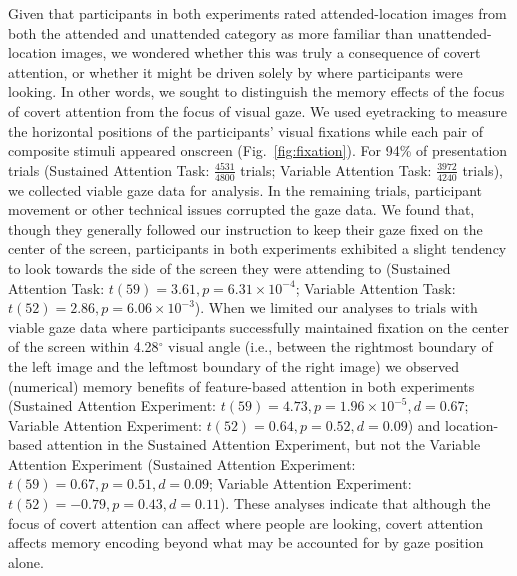 \documentclass[english]{article}
\begin{document}
Given that participants in both experiments rated attended-location images from both the attended and unattended category as more familiar than unattended-location images, we wondered whether this was truly a consequence of covert attention, or whether it might be driven solely by where participants were looking. In other words, we sought to distinguish the memory effects of the focus of covert attention from the focus of visual gaze.  We used eyetracking to measure the horizontal positions of the participants' visual fixations while each pair of composite stimuli appeared onscreen (Fig.~\ref{fig:fixation}). For 94\% of presentation trials (Sustained Attention Task: $\frac{4531}{4800}$ trials; Variable Attention Task: $\frac{3972}{4240}$ trials), we collected viable gaze data for analysis. In the remaining trials, participant movement or other technical issues corrupted the gaze data. We found that, though they generally followed our instruction to keep their gaze fixed on the center of the screen, participants in both experiments exhibited a slight tendency to look towards the side of the screen they were attending to (Sustained Attention Task: $t(59) = 3.61, p = 6.31 \times 10^{-4}$; Variable Attention Task: $t(52) = 2.86, p = 6.06 \times 10^{-3}$). When we limited our analyses to trials with viable gaze data where participants successfully maintained fixation on the center of the screen within 4.28$^\circ$ visual angle (i.e., between the rightmost boundary of the left image and the leftmost boundary of the right image) we observed (numerical) memory benefits of feature-based attention in both experiments (Sustained Attention Experiment: $t(59) = 4.73, p = 1.96 \times 10^{-5}, d = 0.67$; Variable Attention Experiment: $t(52) = 0.64, p = 0.52, d = 0.09$) and location-based attention in the Sustained Attention Experiment, but not the Variable Attention Experiment (Sustained Attention Experiment: $t(59) = 0.67, p = 0.51, d = 0.09$; Variable Attention Experiment: $t(52) = -0.79, p = 0.43, d = 0.11$).  These analyses indicate that although the focus of covert attention can affect where people are looking, covert attention affects memory encoding beyond what may be accounted for by gaze position alone.
\end{document}
